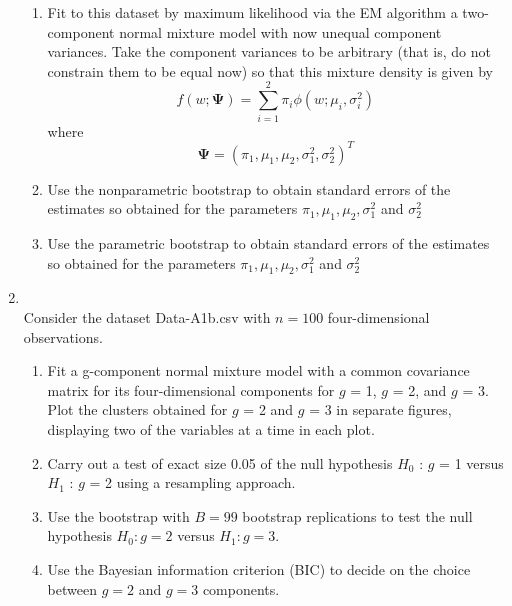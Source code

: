 \documentclass[10pt]{article}
\newcommand{\ds}{\displaystyle}
\newcommand{\bs}{\boldsymbol}
\begin{document}
\begin{enumerate}[label=\textbf{\alph*)}]
\begin{enumerate}[label=\textbf{(\roman*)}]
        \item \text{[2 marks]} Fit to this dataset by maximum likelihood via the EM algorithm a two-component normal mixture model with now unequal component variances. Take the component variances to be arbitrary (that is, do not constrain them to be equal now) so that this mixture density is given by
         \[ f(w; \bs \Psi) = \ds \sum_{i=1}^2 \pi_i \phi(w; \mu_i, \sigma_i^2)\]
         where
         \[ \bs \Psi = (\pi_1, \mu_1, \mu_2, \sigma_1^2, \sigma_2^2)^T\]
        \item \text{[2 marks]} Use the nonparametric bootstrap to obtain standard errors of the estimates so obtained for the parameters $\pi_1, \mu_1, \mu_2, \sigma_1^2$ and $\sigma_2^2$\\
        \item \text{[2 marks]} Use the parametric bootstrap to obtain standard errors of the estimates so obtained for the parameters $\pi_1, \mu_1, \mu_2, \sigma_1^2$ and $\sigma_2^2$
    \end{enumerate}
    \item \text{[10 marks]}\\
    Consider the dataset Data-A1b.csv with $n = 100$ four-dimensional observations.
     \begin{enumerate}[label=\textbf{(\roman*)}]
        \item \text{[4 marks]} Fit a g-component normal mixture model with a common covariance matrix for its four-dimensional components for $g$ = 1, $g$ = 2, and $g$ = 3. Plot the clusters obtained for $g$ = 2 and $g$ = 3 in separate figures, displaying two of the variables at a time in each plot.\\
        \item \text{[2 marks]} Carry out a test of exact size 0.05 of the null hypothesis $H_0$ : $g$ = 1 versus $H_1$ : $g$ = 2 using a resampling approach.\\
        \item \text{[2 marks]} Use the bootstrap with $B = 99$ bootstrap replications to test the null hypothesis $H_0: g = 2$ versus $H_1: g = 3$.\\
        \item \text{[2 marks]} Use the Bayesian information criterion (BIC) to decide on the choice between $g = 2$ and $g = 3$ components.
     \end{enumerate}
\end{enumerate}
\end{document}
